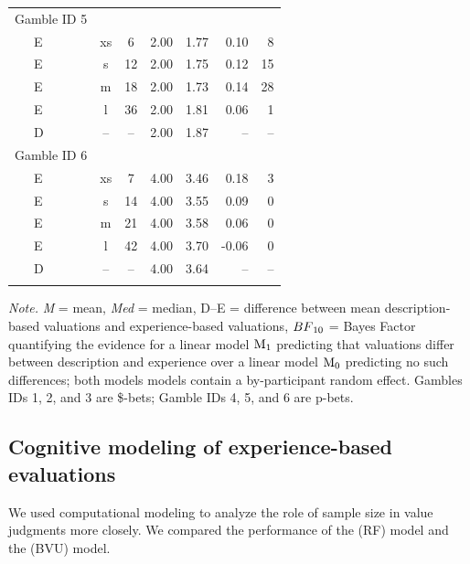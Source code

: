 \documentclass[a4paper, man, floatsintext]{apa6}
\begin{document}
\begin{table}[tbp]
\begin{center}
\begin{threeparttable}
\begin{tabular}{lccccrr}
Gamble ID 5 &  &  &  &  &  & \\
\ \ \ E & xs & 6 & 2.00 & 1.77 & 0.10 & 8\\
\ \ \ E & s & 12 & 2.00 & 1.75 & 0.12 & 15\\
\ \ \ E & m & 18 & 2.00 & 1.73 & 0.14 & 28\\
\ \ \ E & l & 36 & 2.00 & 1.81 & 0.06 & 1\\
\ \ \ D & -- & -- & 2.00 & 1.87 & -- & --\\
Gamble ID 6 &  &  &  &  &  & \\
\ \ \ E & xs & 7 & 4.00 & 3.46 & 0.18 & 3\\
\ \ \ E & s & 14 & 4.00 & 3.55 & 0.09 & 0\\
\ \ \ E & m & 21 & 4.00 & 3.58 & 0.06 & 0\\
\ \ \ E & l & 42 & 4.00 & 3.70 & -0.06 & 0\\
\ \ \ D & -- & -- & 4.00 & 3.64 & -- & --\\
\bottomrule
\addlinespace
\end{tabular}

\begin{tablenotes}[para]
\normalsize{\textit{Note.} \textit{M} = mean, \textit{Med} = median, D--E = difference between mean description-based valuations and experience-based valuations, $BF\textsubscript{10}$ = Bayes Factor quantifying the evidence for a linear model $\mathrm{M}\textsubscript{1}$ predicting that valuations differ between description and experience over a linear model $\mathrm{M}\textsubscript{0}$ predicting no such differences; both models models contain a by-participant random effect. Gambles IDs 1, 2, and 3 are \$-bets; Gamble IDs 4, 5, and 6 are p-bets.}
\end{tablenotes}

\end{threeparttable}
\end{center}

\end{table}

\subsection{Cognitive modeling of experience-based evaluations}

We used computational modeling to analyze the role of sample size in
value judgments more closely. We compared the performance of the
 (RF) model and the
 (BVU) model.
\end{document}
